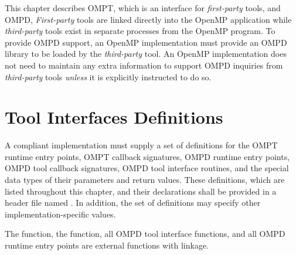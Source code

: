 This chapter describes OMPT, which is an interface for \emph{first-party} tools,
and OMPD, \emph{First-party} tools are linked directly into the OpenMP application
while \emph{third-party} tools exist in separate processes from the OpenMP program.
To provide OMPD support, an OpenMP implementation must provide an OMPD library to 
be loaded by the \emph{third-party} tool. An OpenMP implementation does not need 
to maintain any extra information to support OMPD inquiries from \emph{third-party} 
tools \emph{unless} it is explicitly instructed to do so.

\section{Tool Interfaces Definitions}
\label{sec:tool_interfaces_definitions}

\begin{ccppspecific}
A compliant implementation must supply a set of definitions for the OMPT runtime 
entry points, OMPT callback signatures, OMPD runtime entry points, OMPD tool 
callback signatures, OMPD tool interface routines, and the special data types of 
their parameters and return values. These definitions, which are listed throughout
this chapter, and their declarations shall be provided in a header file named 
. In addition, the set of definitions may specify other 
implementation-specific values.

The  function, the  function, 
all OMPD tool interface functions, and all OMPD runtime entry points are 
external functions with  linkage.
\end{ccppspecific}







